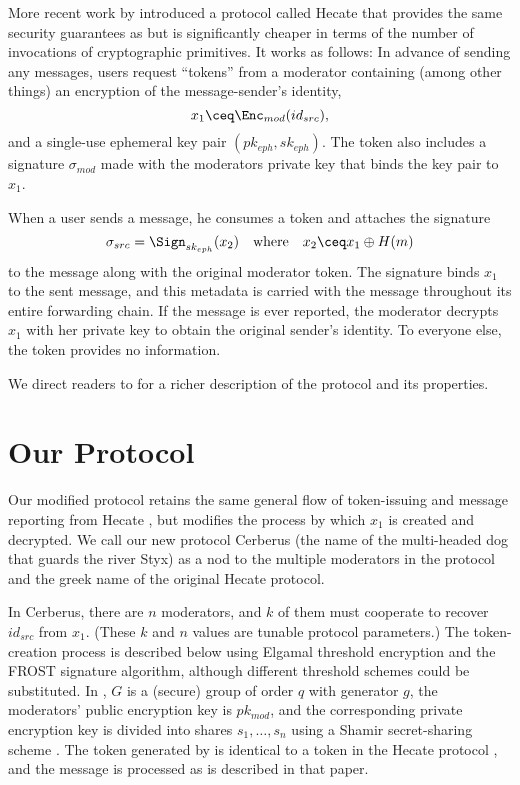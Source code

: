 \documentclass[conference]{IEEEtran}
\begin{document}
More recent work by \textcite{hecate} introduced a protocol called Hecate that provides the same security guarantees as \textcite{tglmr} but is significantly cheaper in terms of the number of invocations of cryptographic primitives.
It works as follows:
In advance of sending any messages, users request ``tokens'' from a moderator containing (among other things) an encryption of the message-sender's identity,
\begin{equation}
	x_1 \ceq \Enc_{mod}(id_{src}),
\end{equation}
and a single-use ephemeral key pair $(pk_{eph}, sk_{eph})$.
The token also includes a signature $\sigma_{mod}$ made with the moderators private key that binds the key pair to $x_1$.

When a user sends a message, he consumes a token and attaches the signature
\begin{equation}
	\sigma_{src} = \Sign_{sk_{eph}}(x_2)
	\quad \text{where} \quad
	x_2 \ceq x_1 \oplus H(m)
\end{equation}
to the message along with the original moderator token.
The signature binds $x_1$ to the sent message, and this metadata is carried with the message throughout its entire forwarding chain.
If the message is ever reported, the moderator decrypts $x_1$ with her private key to obtain the original sender's identity.
To everyone else, the token provides no information.

We direct readers to \textcite{hecate} for a richer description of the protocol and its properties.

\section{Our Protocol}

Our modified protocol retains the same general flow of token-issuing and message reporting from Hecate \cite{hecate}, but modifies the process by which $x_1$ is created and decrypted.
We call our new protocol Cerberus (the name of the multi-headed dog that guards the river Styx) as a nod to the multiple moderators in the protocol and the greek name of the original Hecate protocol.

In Cerberus, there are $n$ moderators, and $k$ of them must cooperate to recover $id_{src}$ from $x_1$.
(These $k$ and $n$ values are tunable protocol parameters.)
The token-creation process is described below using Elgamal threshold encryption and the FROST \cite{frost} signature algorithm, although different threshold schemes could be substituted. In , $G$ is a (secure) group of order $q$ with generator $g$, the moderators' public encryption key is $pk_{mod}$, and the corresponding private encryption key is divided into shares $s_1, \ldots, s_n$ using a Shamir secret-sharing scheme \cite{shamir-secret-sharing}.
The token generated by  is identical to a token in the Hecate protocol \cite{hecate}, and the message is processed as is described in that paper.
\end{document}
